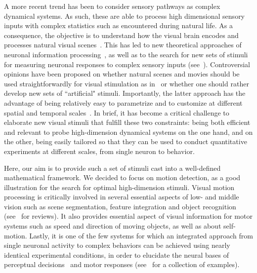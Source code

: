 \documentclass[a4paper,11pt]{article}%
\begin{document}
A more recent trend has been to consider sensory pathways as complex dynamical systems. As such, these are able to process high dimensional sensory inputs with complex statistics such as encountered during natural life. As a consequence, the objective is to understand how the visual brain encodes and processes natural visual scenes~\citep{Dan96}. This has led to new theoretical approaches of neuronal information processing~\citep{Field99}, as well as to the search for new sets of stimuli for measuring neuronal responses to complex sensory inputs (see~\citep{Touryan01,Wu06}). Controversial opinions have been proposed on whether natural scenes and movies should be used straightforwardly for visual stimulation as in~\citep{Felsen2005Natural} or whether one should rather develop new sets of ``artificial" stimuli. Importantly, the latter approach has the advantage of being relatively easy to parametrize and to customize at different spatial and temporal scales~\citep{Rust05}. In brief, it has become a critical challenge to elaborate new visual stimuli that fulfill these two constraints: being both efficient and relevant to probe high-dimension dynamical systems on the one hand, and on the other, being easily tailored so that they can be used to conduct quantitative experiments at different scales, from single neuron to behavior.
 
Here, our aim is to provide such a set of stimuli cast into a well-defined mathematical framework. We decided to focus on motion detection, as a good illustration for the search for optimal high-dimension stimuli. Visual motion processing is critically involved in several essential aspects of low- and middle vision such as scene segmentation, feature integration and object recognition (see~\citep{Braddick1993Segmentation,Bradley08,Burr11} for reviews). It also provides essential aspect of visual information for motor systems such as speed and direction of moving objects, as well as about self-motion. Lastly, it is one of the few systems for which an integrated approach from single neuronal activity to complex behaviors can be achieved using nearly identical experimental conditions, in order to elucidate the neural bases of perceptual decisions~\citep{Newsome1997Deciding} and motor responses (see~\citep{Masson10} for a collection of examples). 
\end{document}

